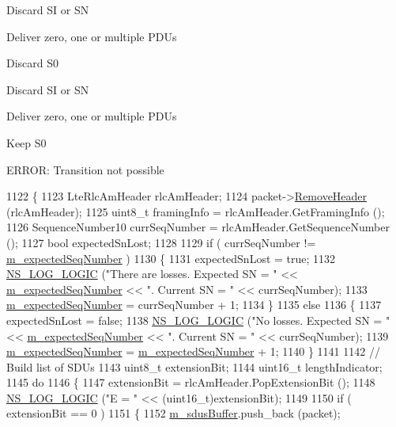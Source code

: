 Discard SI or SN

Deliver zero, one or multiple P\+D\+Us

Discard S0

Discard SI or SN

Deliver zero, one or multiple P\+D\+Us

Keep S0

E\+R\+R\+OR\+: Transition not possible
\begin{DoxyCode}
1122 \{
1123   LteRlcAmHeader rlcAmHeader;
1124   packet->\hyperlink{classns3_1_1Packet_a0961eccf975d75f902d40956c93ba63e}{RemoveHeader} (rlcAmHeader);
1125   uint8\_t framingInfo = rlcAmHeader.GetFramingInfo ();
1126   SequenceNumber10 currSeqNumber = rlcAmHeader.GetSequenceNumber ();
1127   \textcolor{keywordtype}{bool} expectedSnLost;
1128 
1129   \textcolor{keywordflow}{if} ( currSeqNumber != \hyperlink{classns3_1_1LteRlcAm_af1a3c33569b7cace34c47ed93fe29090}{m\_expectedSeqNumber} )
1130     \{
1131       expectedSnLost = \textcolor{keyword}{true};
1132       \hyperlink{group__logging_ga88acd260151caf2db9c0fc84997f45ce}{NS\_LOG\_LOGIC} (\textcolor{stringliteral}{"There are losses. Expected SN = "} << 
      \hyperlink{classns3_1_1LteRlcAm_af1a3c33569b7cace34c47ed93fe29090}{m\_expectedSeqNumber} << \textcolor{stringliteral}{". Current SN = "} << currSeqNumber);
1133       \hyperlink{classns3_1_1LteRlcAm_af1a3c33569b7cace34c47ed93fe29090}{m\_expectedSeqNumber} = currSeqNumber + 1;
1134     \}
1135   \textcolor{keywordflow}{else}
1136     \{
1137       expectedSnLost = \textcolor{keyword}{false};
1138       \hyperlink{group__logging_ga88acd260151caf2db9c0fc84997f45ce}{NS\_LOG\_LOGIC} (\textcolor{stringliteral}{"No losses. Expected SN = "} << 
      \hyperlink{classns3_1_1LteRlcAm_af1a3c33569b7cace34c47ed93fe29090}{m\_expectedSeqNumber} << \textcolor{stringliteral}{". Current SN = "} << currSeqNumber);
1139       \hyperlink{classns3_1_1LteRlcAm_af1a3c33569b7cace34c47ed93fe29090}{m\_expectedSeqNumber} = \hyperlink{classns3_1_1LteRlcAm_af1a3c33569b7cace34c47ed93fe29090}{m\_expectedSeqNumber} + 1;
1140     \}
1141 
1142   \textcolor{comment}{// Build list of SDUs}
1143   uint8\_t extensionBit;
1144   uint16\_t lengthIndicator;
1145   \textcolor{keywordflow}{do}
1146     \{
1147       extensionBit = rlcAmHeader.PopExtensionBit ();
1148       \hyperlink{group__logging_ga88acd260151caf2db9c0fc84997f45ce}{NS\_LOG\_LOGIC} (\textcolor{stringliteral}{"E = "} << (uint16\_t)extensionBit);
1149 
1150       \textcolor{keywordflow}{if} ( extensionBit == 0 )
1151         \{
1152           \hyperlink{classns3_1_1LteRlcAm_abd47ae50bcc975615b87dd53d86efd8e}{m\_sdusBuffer}.push\_back (packet);

\end{DoxyCode}
